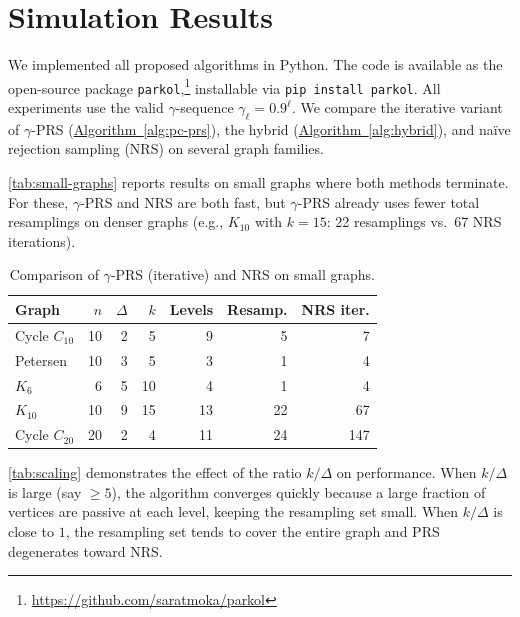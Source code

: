 \documentclass[12pt, a4paper]{article}
\theoremstyle{plain}
\theoremstyle{definition}
\theoremstyle{remark}
\newcommand{\sref}[2]{\hyperref[#2]{#1~\ref*{#2}}}
\begin{document}
\section{Simulation Results}\label{sec:sim-results}

We implemented all proposed algorithms in Python. The code is available as the open-source package \texttt{parkol},\footnote{\url{https://github.com/saratmoka/parkol}} installable via \texttt{pip install parkol}. All experiments use the valid \(\gamma\)-sequence \(\gamma_\ell=0.9^\ell\). We compare the iterative variant of \(\gamma\)-PRS (\sref{Algorithm}{alg:pc-prs}), the hybrid (\sref{Algorithm}{alg:hybrid}), and na\"{i}ve rejection sampling (NRS) on several graph families.

\autoref{tab:small-graphs} reports results on small graphs where both methods terminate. For these, \(\gamma\)-PRS and NRS are both fast, but \(\gamma\)-PRS already uses fewer total resamplings on denser graphs (e.g., \(K_{10}\) with \(k=15\): 22 resamplings vs.\ 67 NRS iterations).

\begin{table}[ht]
\centering
\begin{tabular}{l r r r | r r | r}
\hline
Graph & \(n\) & \(\Delta\) & \(k\) & Levels & Resamp. & NRS iter. \\
\hline
Cycle \(C_{10}\) & 10 & 2 & 5 & 9 & 5 & 7 \\
Petersen & 10 & 3 & 5 & 3 & 1 & 4 \\
\(K_6\) & 6 & 5 & 10 & 4 & 1 & 4 \\
\(K_{10}\) & 10 & 9 & 15 & 13 & 22 & 67 \\
Cycle \(C_{20}\) & 20 & 2 & 4 & 11 & 24 & 147 \\
\hline
\end{tabular}
\caption{Comparison of \(\gamma\)-PRS (iterative) and NRS on small graphs.}
\label{tab:small-graphs}
\end{table}

\autoref{tab:scaling} demonstrates the effect of the ratio \(k/\Delta\) on performance. When \(k/\Delta\) is large (say \(\geq 5\)), the algorithm converges quickly because a large fraction of vertices are passive at each level, keeping the resampling set small. When \(k/\Delta\) is close to \(1\), the resampling set tends to cover the entire graph and PRS degenerates toward NRS.
\end{document}
